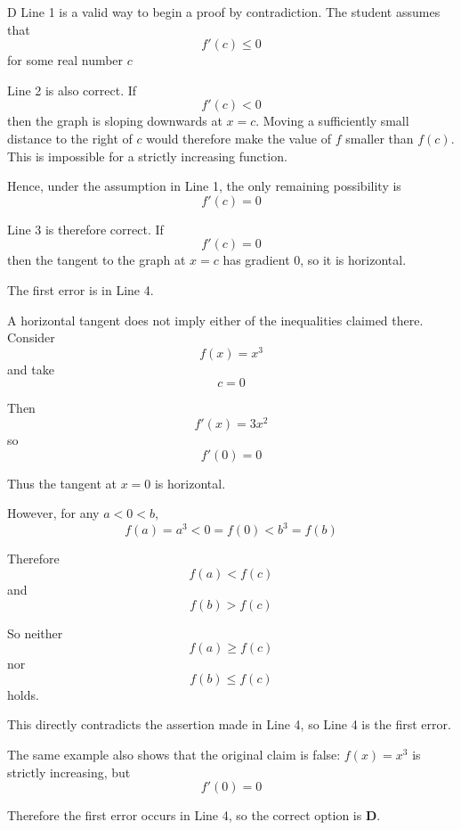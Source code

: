 \documentclass[11pt,a4paper]{article}
\begin{document}
\begin{enumerate}[label=\textbf{\arabic*.},leftmargin=*,itemsep=0pt,start=15]
\begin{djsSolution}{D}
Line 1 is a valid way to begin a proof by contradiction. The student assumes that
\[
f'(c)\leq0
\]
for some real number \(c\)

Line 2 is also correct. If
\[
f'(c)<0
\]
then the graph is sloping downwards at \(x=c\). Moving a sufficiently small distance to the right of \(c\) would therefore make the value of \(f\) smaller than \(f(c)\). This is impossible for a strictly increasing function.

Hence, under the assumption in Line 1, the only remaining possibility is
\[
f'(c)=0
\]

Line 3 is therefore correct. If
\[
f'(c)=0
\]
then the tangent to the graph at \(x=c\) has gradient \(0\), so it is horizontal.

The first error is in Line 4.

A horizontal tangent does not imply either of the inequalities claimed there. Consider
\[
f(x)=x^3
\]
and take
\[
c=0
\]

Then
\[
f'(x)=3x^2
\]
so
\[
f'(0)=0
\]

Thus the tangent at \(x=0\) is horizontal.

However, for any \(a<0<b\),
\[
f(a)=a^3<0=f(0)<b^3=f(b)
\]

Therefore
\[
f(a)<f(c)
\]
and
\[
f(b)>f(c)
\]

So neither
\[
f(a)\geq f(c)
\]
nor
\[
f(b)\leq f(c)
\]
holds.

This directly contradicts the assertion made in Line 4, so Line 4 is the first error.

The same example also shows that the original claim is false: \(f(x)=x^3\) is strictly increasing, but
\[
f'(0)=0
\]

Therefore the first error occurs in Line 4, so the correct option is \textbf{D}.
\end{djsSolution}
\end{enumerate}
\clearpage
\thispagestyle{djssolutions}
\vspace*{8pt}
\end{document}
